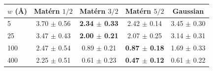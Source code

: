 \begin{tabular}{lcccc}
\toprule
$w$ (\AA) & Mat\'ern $1/2$ & Mat\'ern $3/2$ & Mat\'ern $5/2$ & Gaussian \\
\midrule
5 & 3.70 $\pm$ 0.56 & \textbf{2.34 $\pm$ 0.33} & 2.42 $\pm$ 0.14 & 3.45 $\pm$ 0.30 \\
25 & 3.47 $\pm$ 0.43 & \textbf{2.00 $\pm$ 0.21} & 2.07 $\pm$ 0.25 & 3.14 $\pm$ 0.31 \\
100 & 2.47 $\pm$ 0.54 & 0.89 $\pm$ 0.21 & \textbf{0.87 $\pm$ 0.18} & 1.69 $\pm$ 0.33 \\
400 & 2.25 $\pm$ 0.51 & 0.61 $\pm$ 0.23 & \textbf{0.47 $\pm$ 0.12} & 0.61 $\pm$ 0.22 \\
\bottomrule
\end{tabular}
